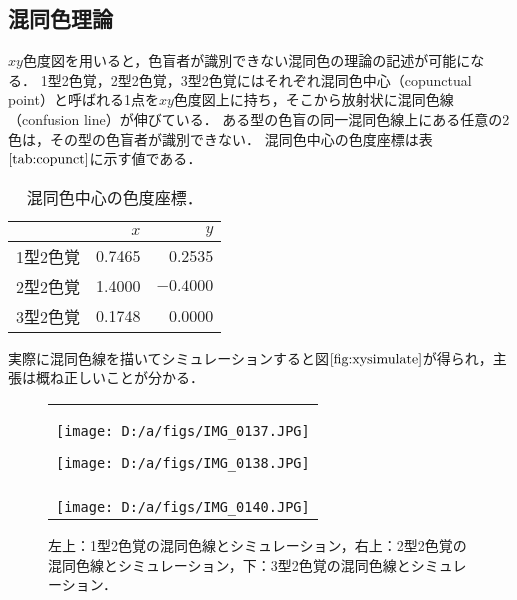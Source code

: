 \documentclass[uplatex,paper=a4,fontsize=4.0truemm,jafontsize=4.0truemm,head_space=30.0truemm,foot_space=30.0truemm,baselineskip=8.0truemm,line_length=40zw,gutter=25.0truemm,oneside,openany,fleqn,hanging_panctuation,open_bracket_pos=nibu_tentsuki,dvipdfmx,jis2004,book,titlepage]{jlreq}
\theoremstyle{mystyle}
\newcommand{\captiondot}[1]{\caption{#1．}}
\newcommand{\tableinput}[4]{\begin{table}[btp]\centering\captiondot{#3}\label{tab:#4}\begin{tabular}{#1}#2\end{tabular}\end{table}}
\newcommand{\mathdisplaystyle}[1]{\(\displaystyle{#1}\)}
\newcommand{\Reference}[1]{\mathdisplaystyle{\ref{#1}}}
\newcommand{\negativevalue}[1]{{-#1}}
\begin{document}
			\subsection{混同色理論}
				\mathdisplaystyle{xy}色度図を用いると，色盲者が識別できない混同色の理論の記述が可能になる．
				1型2色覚，2型2色覚，3型2色覚にはそれぞれ混同色中心（copunctual point）と呼ばれる1点を\mathdisplaystyle{xy}色度図上に持ち，そこから放射状に混同色線（confusion line）が伸びている．
				ある型の色盲の同一混同色線上にある任意の2色は，その型の色盲者が識別できない．
				混同色中心の色度座標は表\Reference{tab:copunct}に示す値である\cite[Table 1]{Fomins2011}．
				\tableinput{l|rr}{ & \(x\) & \(y\) \\ \hline
					1型2色覚 & 0.7465 & 0.2535 \\
					2型2色覚 & 1.4000 & \mathdisplaystyle{\negativevalue{0.4000}} \\
					3型2色覚 & 0.1748 & 0.0000}{混同色中心の色度座標}{copunct}
				実際に混同色線を描いてシミュレーションすると図\Reference{fig:xysimulate}が得られ，主張は概ね正しいことが分かる．
				\begin{figure}[tbp]
					\centering
					\begin{tabular}{c}
						\begin{minipage}{0.5\linewidth}
							\centering
							\texttt{[image: D:/a/figs/IMG\_0137.JPG]}
						\end{minipage}
						\begin{minipage}{0.5\linewidth}
							\centering
							\texttt{[image: D:/a/figs/IMG\_0138.JPG]}
						\end{minipage} \\
						\begin{minipage}{0.06\linewidth}
							\vspace{10truemm}
						\end{minipage} \\
						\begin{minipage}{0.5\linewidth}
							\centering
							\texttt{[image: D:/a/figs/IMG\_0140.JPG]}
						\end{minipage}
						\begin{minipage}{0.5\linewidth}
							\vspace{10truemm}
						\end{minipage}
					\end{tabular}
					\captiondot{左上：1型2色覚の混同色線とシミュレーション，右上：2型2色覚の混同色線とシミュレーション，下：3型2色覚の混同色線とシミュレーション}\label{fig:xysimulate}
				\end{figure}
\end{document}
